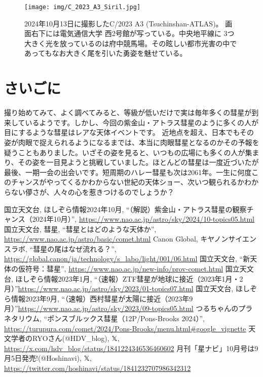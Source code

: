 \documentclass[../../super_nova_2024]{subfiles}
\begin{document}
\begin{figure}
  \centering
  \texttt{[image: img/C\_2023\_A3\_Siril.jpg]}
  \caption{2024年10月13日に撮影したC/2023 A3 (Tsuchinshan-ATLAS)。 画面右下には電気通信大学 西2号館が写っている。中央地平線に
  3つ大きく光を放っているのは府中競馬場。その眩しい都市光害の中であってもなお大きく尾を引いた勇姿を魅せている。}
  \label{fig:Tsuchinshan-ATLAS}
\end{figure}

\clearpage
\section{さいごに}

撮り始めてみて、よく調べてみると、等級が低いだけで実は毎年多くの彗星が到来しているようです。しかし、今回の紫金山・アトラス彗星のように多くの人が目にするような彗星はレアな天体イベントです。
近地点を超え、日本でもその姿が肉眼で捉えられるようになるまでは、本当に肉眼彗星となるのかその予報を疑うこともありました。いざその姿を見ると、いつもの広場にも多くの人が集まり、その姿を一目見ようと挑戦していました。ほとんどの彗星は一度近づいたが最後、一期一会の出会いです。短周期のハレー彗星も次は2061年。一生に何度このチャンスがやってくるかわからない世紀の天体ショー、次いつ観られるかわからない儚さが、人々の心を惹きつけるのでしょうか？



\begin{thebibliography}{9}
     国立天文台, ほしぞら情報2024年10月, ``（解説）紫金山・アトラス彗星の観察チャンス（2024年10月）'', \url{https://www.nao.ac.jp/astro/sky/2024/10-topics05.html}
     国立天文台, 彗星, ``彗星とはどのような天体か'', \url{https://www.nao.ac.jp/astro/basic/comet.html}
     Canon Global, キヤノンサイエンスラボ, ``彗星の尾はなぜ流れる？'', \url{https://global.canon/ja/technology/s_labo/light/001/06.html}
     国立天文台, ``新天体の仮符号：彗星'', \url{https://www.nao.ac.jp/new-info/prov-comet.html}
     国立天文台, ほしぞら情報2023年1月, ``（速報）ZTF彗星が地球に接近（2023年1月・2月）''\url{https://www.nao.ac.jp/astro/sky/2023/01-topics07.html}
     国立天文台, ほしぞら情報2023年9月, ``（速報）西村彗星が太陽に接近（2023年9月）''\url{https://www.nao.ac.jp/astro/sky/2023/09-topics05.html}
     つるちゃんのプラネタリウム, ``ポンスブルックス彗星（12P/Pons-Brooks 2024）'', \url{https://turupura.com/comet/2024/Pons-Brooks/menu.html#google_vignette}
     天文学者のRYOさん(@HDV\_blog), 𝕏, \url{https://x.com/hdv_blog/status/1841224346536460602}
     月刊「星ナビ」10月号は9月5日発売!(@Hoshinavi), 𝕏, \url{https://twitter.com/hoshinavi/status/1841232707986342312}
\end{thebibliography}
\end{document}
